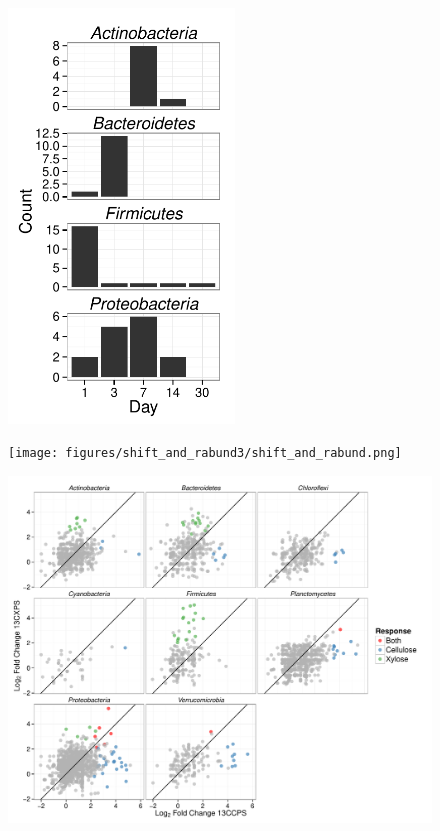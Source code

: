 \begin{figure}[H]
	\begin{center}
	\centerline{\includegraphics[width=6.0cm]{figures/xylose_rspndr_bar/xylose_rspndr_bar.pdf}}
	\caption{\protect}\label{fig:xyl_count}
        \end{center}
\end{figure}

\begin{figure}[H]
	\begin{center}
	\centerline{\texttt{[image: figures/shift\_and\_rabund3/shift\_and\_rabund.png]}}
	\caption{\protect}\label{fig:shift}
    \end{center}
\end{figure}

\begin{figure}[H]
	\begin{center}
    \centerline{\includegraphics[width=11.4cm]{figures/generalist_specialist/generalist_specialist.pdf}}
    \caption{\protect}\label{fig:genspec}
    \end{center} 
\end{figure}

\restoregeometry
